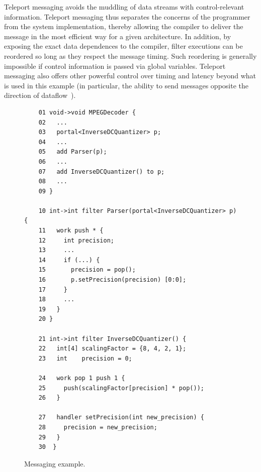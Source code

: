 Teleport messaging avoids the muddling of data streams with
control-relevant information. Teleport messaging thus separates the
concerns of the programmer from the system implementation,
thereby allowing the compiler to deliver the message in the most
efficient way for a given architecture. In addition, by exposing the
exact data dependences to the compiler, filter executions can be
reordered so long as they respect the message timing.  Such reordering
is generally impossible if control information is passed via global
variables.  Teleport messaging also offers other powerful control over
timing and latency beyond what is used in this example (in particular,
the ability to send messages opposite the direction of
dataflow~\cite{thies05ppopp}).

\begin{figure}[t]
  \begin{scriptsize}
    \begin{verbatim}
	01 void->void MPEGDecoder {
	02   ...
	03   portal<InverseDCQuantizer> p;
	04   ...
	05   add Parser(p);
	06   ...
	07   add InverseDCQuantizer() to p;
	08   ...
	09 }

	10 int->int filter Parser(portal<InverseDCQuantizer> p) {
	11   work push * {
	12     int precision;
	13     ...
	14     if (...) {
	15       precision = pop();
	16       p.setPrecision(precision) [0:0];
	17     }
	18     ...
	19   }
	20 }

	21 int->int filter InverseDCQuantizer() {
	22   int[4] scalingFactor = {8, 4, 2, 1};
	23   int    precision = 0;

	24   work pop 1 push 1 {
	25     push(scalingFactor[precision] * pop());
	26   }

	27   handler setPrecision(int new_precision) {
	28     precision = new_precision;
	29   }
	30  }
    \end{verbatim}
  \end{scriptsize}
  \vspace{-24pt}
  \caption{Messaging example.}
  \label{fig:messaging}
\end{figure}

